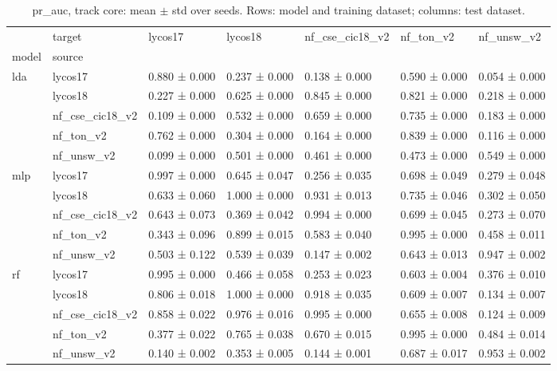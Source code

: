 \begin{table}
\caption{pr_auc, track core: mean $\pm$ std over seeds. Rows: model and training dataset; columns: test dataset.}
\label{tab:matrix_core_pr_auc}
\begin{tabular}{lllllll}
\toprule
 & target & lycos17 & lycos18 & nf_cse_cic18_v2 & nf_ton_v2 & nf_unsw_v2 \\
model & source &  &  &  &  &  \\
\midrule
\multirow[t]{5}{*}{lda} & lycos17 & 0.880 ± 0.000 & 0.237 ± 0.000 & 0.138 ± 0.000 & 0.590 ± 0.000 & 0.054 ± 0.000 \\
 & lycos18 & 0.227 ± 0.000 & 0.625 ± 0.000 & 0.845 ± 0.000 & 0.821 ± 0.000 & 0.218 ± 0.000 \\
 & nf_cse_cic18_v2 & 0.109 ± 0.000 & 0.532 ± 0.000 & 0.659 ± 0.000 & 0.735 ± 0.000 & 0.183 ± 0.000 \\
 & nf_ton_v2 & 0.762 ± 0.000 & 0.304 ± 0.000 & 0.164 ± 0.000 & 0.839 ± 0.000 & 0.116 ± 0.000 \\
 & nf_unsw_v2 & 0.099 ± 0.000 & 0.501 ± 0.000 & 0.461 ± 0.000 & 0.473 ± 0.000 & 0.549 ± 0.000 \\
\cline{1-7}
\multirow[t]{5}{*}{mlp} & lycos17 & 0.997 ± 0.000 & 0.645 ± 0.047 & 0.256 ± 0.035 & 0.698 ± 0.049 & 0.279 ± 0.048 \\
 & lycos18 & 0.633 ± 0.060 & 1.000 ± 0.000 & 0.931 ± 0.013 & 0.735 ± 0.046 & 0.302 ± 0.050 \\
 & nf_cse_cic18_v2 & 0.643 ± 0.073 & 0.369 ± 0.042 & 0.994 ± 0.000 & 0.699 ± 0.045 & 0.273 ± 0.070 \\
 & nf_ton_v2 & 0.343 ± 0.096 & 0.899 ± 0.015 & 0.583 ± 0.040 & 0.995 ± 0.000 & 0.458 ± 0.011 \\
 & nf_unsw_v2 & 0.503 ± 0.122 & 0.539 ± 0.039 & 0.147 ± 0.002 & 0.643 ± 0.013 & 0.947 ± 0.002 \\
\cline{1-7}
\multirow[t]{5}{*}{rf} & lycos17 & 0.995 ± 0.000 & 0.466 ± 0.058 & 0.253 ± 0.023 & 0.603 ± 0.004 & 0.376 ± 0.010 \\
 & lycos18 & 0.806 ± 0.018 & 1.000 ± 0.000 & 0.918 ± 0.035 & 0.609 ± 0.007 & 0.134 ± 0.007 \\
 & nf_cse_cic18_v2 & 0.858 ± 0.022 & 0.976 ± 0.016 & 0.995 ± 0.000 & 0.655 ± 0.008 & 0.124 ± 0.009 \\
 & nf_ton_v2 & 0.377 ± 0.022 & 0.765 ± 0.038 & 0.670 ± 0.015 & 0.995 ± 0.000 & 0.484 ± 0.014 \\
 & nf_unsw_v2 & 0.140 ± 0.002 & 0.353 ± 0.005 & 0.144 ± 0.001 & 0.687 ± 0.017 & 0.953 ± 0.002 \\

\end{tabular}
\end{table}
